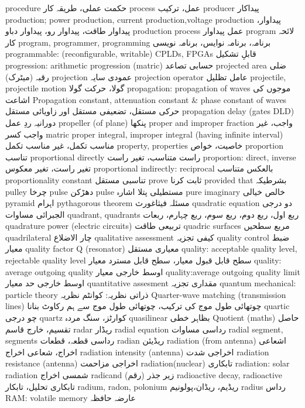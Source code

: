 procedure	حکمت عملی، طریقہ کار
process	عمل، ترکیب
producer	پیداکار
production; power production, current production,voltage production	پیداوار، پیداوار طاقت، پیداوار رو، پیداوار دباو
production process	عمل پیداوار
program	لائحہ کار
program, programmer, programming	برنامہ، برنامہ نوایس، برنامہ نویسی
programmable: (reconfigurable, writable) CPLDs, FPGAs	قابلِ تشکیل
progression: arithmetic progression (matric)	حسابی تصاعد
projected area	ضلی رقبہ (میٹرک)
projection	عمودی سایہ
projection operator	عامل تظلیل
projectile, projectile motion	گولا، حرکت گولا
propagation: propagation of waves	موجوں کی اشاعت
Propagation constant, attenuation constant &  phase constant of waves	حرکی مستقل، تضعیفی مستقل اور زاویائی مستقل
propagation delay (gates DLD)	دورانیہ ردِ عمل
propeller (of plane)	پنکھا
proper and improper fraction	واجب، غیر واجب کسر matric
proper integral, improper integral (having infinite interval)	مناسب تکمل، غیر مناسب تکمل
property, properties	خاصیت، خواص
proportion	تناسب
proportional directly	 راست متناسب، تغیر راست
proportion: direct, inverse	تغیر راست، تغیر معکوس
proportional indirectly: reciprocal	بالعکس متناسب
proportionality constant	تناسبی مستقل
prove	ثابت کرنا
provided that	بشرطیکہ
pulley	چرخا
pulse	دھڑکن
pulse	مستطیلی پتلا اشارہ
pure imaginary	خالص خیالی
pyramid	اہرام
pythagorous theorem	مسئلہ فیثاغورث
quadratic equation	دو درجی الجبرائی مساوات
quadrant, quadrants	ربع اول، ربع دوم، ربع سوم، ربع چہارم، ربعات
quadrature power (electric circuits)	تربیعی طاقت
quadric surfaces	مربع سطحیں
quadrilateral	چار الاضلاع
qualitative assessment	کیفی تجزیہ
quality control	ضبط معیار
quality factor Q (resonator)	معیاری مستقل
quality: acceptable quality level, rejectable quality level	سطح قابل قبول معیار، سطح قابل مسترد معیار
quality: average outgoing quality	اوسط خارجی معیار
quality:average outgoing quality limit	اوسط خارجی حد معیار
quantitative assesment	مقداری تجزیہ
quantum mechanical: particle theory	ذراتی نظریہ: کوانٹم نظریہ
Quarter-wave matching (transmission lines)	چوتھائی طول موج کی ترکیب، چوتھائی طول موج سے ہم رکاوٹ بنانا
quartic	چو درجی
quartz	کوارٹز، سنگ مردہ
quasilinear	بظاہر خطی
Quotient (maths)	حاصل تقسیم، خارج قاسم
radar	ریڈار
radial equation	رداسی مساوات
radial segment, segments	رداسی قطعہ، قطعات
radian	ریڈیئن
radiation (from antenna)	اشعاعی اخراج، شعاعی اخراج
radiation intensity (antenna)	اخراجی شدت
radiation resistance (antenna)	اخراجی مزاحمت
radiation(nuclear)	تابکاری
radiation: solar radiation	شمسی اخراج
radicand	زیر جذر (رقم)
radioactive decay, radioactive	تابکاری تحلیل، تابکار
radium, radon, polonium	ریڈیم، ریڈان،پولونیم
radius	رداس
RAM: volatile memory	عارضہ حافظہ
